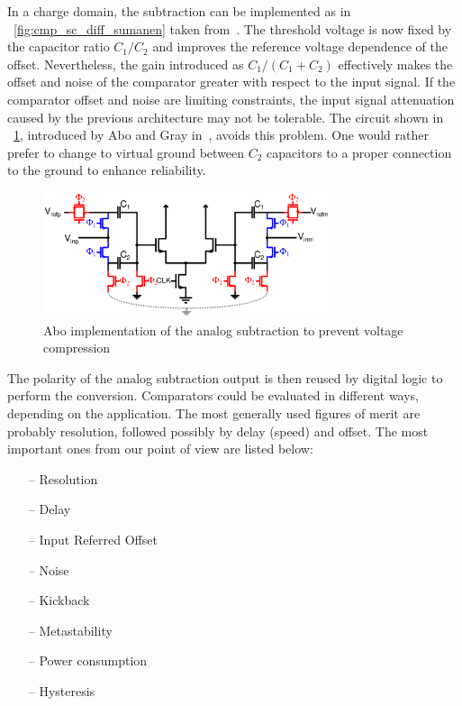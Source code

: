 In a charge domain, the subtraction can be implemented as in \figurename~\ref{fig:cmp_sc_diff_sumanen} taken from~\cite{Sumanen2002}. The threshold voltage is now fixed by the capacitor ratio \(C_1/C_2 \) and improves the reference voltage dependence of the offset. Nevertheless, the gain introduced as \(C_1/(C_1+C_2) \) effectively makes the offset and noise of the comparator greater with respect to the input signal. If the comparator offset and noise are limiting constraints, the input signal attenuation caused by the previous architecture may not be tolerable. The circuit shown in \figurename~\ref{fig:abo_sc}, introduced by Abo and Gray in~\cite{Abo1999}, avoids this problem. One would rather prefer to change to virtual ground between \(C_2\) capacitors to a proper connection to the ground to enhance reliability.

\begin{figure}[htp]
	\centering
    \includegraphics[width=0.75\textwidth]{Chapter7/Figs/abo_sc.ps}
	\caption{Abo implementation of the analog subtraction to prevent voltage compression}
	\label{fig:abo_sc}
\end{figure}

The polarity of the analog subtraction output is then reused by digital logic to perform the conversion. Comparators could be evaluated in different ways, depending on the application. The most generally used figures of merit are probably resolution, followed possibly by delay (speed) and offset. The most important ones from our point of view are listed below:
\begin{multicols}{2}
    \begin{itemize}
        \itemsep-0.5em
        \item[--] Resolution
        \item[--] Delay
        \item[--] Input Referred Offset
        \item[--] Noise
        \item[--] Kickback
        \item[--] Metastability
        \item[--] Power consumption
        \item[--] Hysteresis
    \end{itemize}
\end{multicols}

